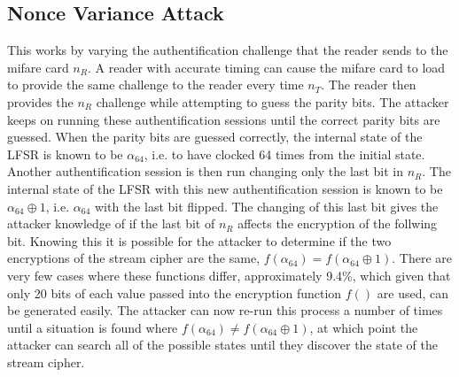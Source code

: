 \subsection{Nonce Variance Attack}
This works by varying the authentification challenge that the reader sends to the mifare card $n_{R}$.
A reader with accurate timing can cause the mifare card to load to provide the same challenge to the reader every time $n_{T}$.
The reader then provides the $n_{R}$ challenge while attempting to guess the parity bits.
The attacker keeps on running these authentification sessions until the correct parity bits are guessed.
When the parity bits are guessed correctly, the internal state of the LFSR is known to be $\alpha_{64}$, i.e. to have clocked 64 times from the initial state.
Another authentification session is then run changing only the last bit in $n_{R}$.
The internal state of the LFSR with this new authentification session is known to be $\alpha_{64} \oplus 1$, i.e. $\alpha_{64}$ with the last bit flipped.
The changing of this last bit gives the attacker knowledge of if the last bit of $n_{R}$ affects the encryption of the follwing bit.
Knowing this it is possible for the attacker to determine if the two encryptions of the stream cipher are the same, $f(\alpha_{64}) = f(\alpha_{64} \oplus 1)$.
There are very few cases where these functions differ, approximately 9.4\%, which given that only 20 bits of each value passed into the encryption function $f()$ are used, can be generated easily.
The attacker can now re-run this process a number of times until a situation is found where $f(\alpha_{64}) \ne f(\alpha_{64} \oplus 1)$, at which point the attacker can search all of the possible states until they discover the state of the stream cipher.
